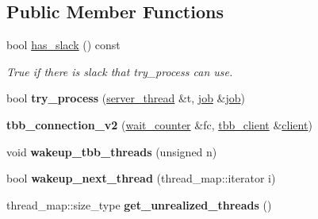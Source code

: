 \subsection*{Public Member Functions}
\begin{DoxyCompactItemize}
\item 
\hypertarget{classrml_1_1internal_1_1tbb__connection__v2_a8f5facbb179a6678c10a352593e542bd}{}bool \hyperlink{classrml_1_1internal_1_1tbb__connection__v2_a8f5facbb179a6678c10a352593e542bd}{has\+\_\+slack} () const \label{classrml_1_1internal_1_1tbb__connection__v2_a8f5facbb179a6678c10a352593e542bd}

\begin{DoxyCompactList}\small\item\em True if there is slack that try\+\_\+process can use. \end{DoxyCompactList}\item 
\hypertarget{classrml_1_1internal_1_1tbb__connection__v2_a810a704319f94dccc9394c62ca8f415f}{}bool {\bfseries try\+\_\+process} (\hyperlink{classrml_1_1internal_1_1server__thread}{server\+\_\+thread} \&t, \hyperlink{classrml_1_1server_ac812e52a5bb3de275e624c36997eac0e}{job} \&\hyperlink{classrml_1_1server_ac812e52a5bb3de275e624c36997eac0e}{job})\label{classrml_1_1internal_1_1tbb__connection__v2_a810a704319f94dccc9394c62ca8f415f}

\item 
\hypertarget{classrml_1_1internal_1_1tbb__connection__v2_aacfa61222ed83612b7dfb4fdce21d34a}{}{\bfseries tbb\+\_\+connection\+\_\+v2} (\hyperlink{classrml_1_1internal_1_1wait__counter}{wait\+\_\+counter} \&fc, \hyperlink{classtbb_1_1internal_1_1rml_1_1tbb__client}{tbb\+\_\+client} \&\hyperlink{classrml_1_1client}{client})\label{classrml_1_1internal_1_1tbb__connection__v2_aacfa61222ed83612b7dfb4fdce21d34a}

\item 
\hypertarget{classrml_1_1internal_1_1tbb__connection__v2_a42c2fd712d4f473330673b0a7e6f91f9}{}void {\bfseries wakeup\+\_\+tbb\+\_\+threads} (unsigned n)\label{classrml_1_1internal_1_1tbb__connection__v2_a42c2fd712d4f473330673b0a7e6f91f9}

\item 
\hypertarget{classrml_1_1internal_1_1tbb__connection__v2_acf5b1bcfe32927e0ded682da40ba8593}{}bool {\bfseries wakeup\+\_\+next\+\_\+thread} (thread\+\_\+map\+::iterator i)\label{classrml_1_1internal_1_1tbb__connection__v2_acf5b1bcfe32927e0ded682da40ba8593}

\item 
\hypertarget{classrml_1_1internal_1_1tbb__connection__v2_ad9995ecfadba78a39beb419249a98f3d}{}thread\+\_\+map\+::size\+\_\+type {\bfseries get\+\_\+unrealized\+\_\+threads} ()\label{classrml_1_1internal_1_1tbb__connection__v2_ad9995ecfadba78a39beb419249a98f3d}

\end{DoxyCompactItemize}

